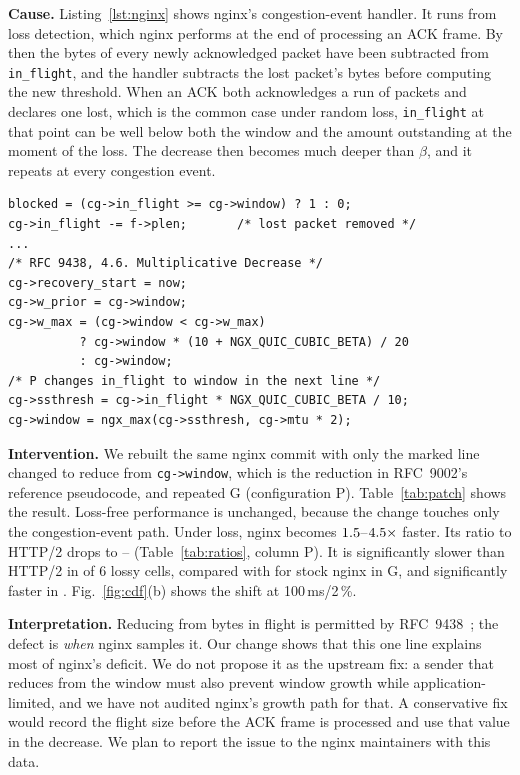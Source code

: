 \documentclass[conference]{IEEEtran}
\newcommand{\hthree}{HTTP/3}
\newcommand{\htwo}{HTTP/2}
\begin{document}
\textbf{Cause.} Listing~\ref{lst:nginx} shows nginx's congestion-event handler. It runs from loss detection, which nginx
performs at the end of processing an ACK frame. By then the bytes of every newly acknowledged packet have been subtracted
from \texttt{in\_flight}, and the handler subtracts the lost packet's bytes before computing the new threshold. When an
ACK both acknowledges a run of packets and declares one lost, which is the common case under random loss,
\texttt{in\_flight} at that point can be well below both the window and the amount outstanding at the moment of the loss.
The decrease then becomes much deeper than $\beta$, and it repeats at every congestion event.

\begin{lstlisting}[caption={Congestion-event handler in nginx's QUIC module (abridged)},
  label={lst:nginx}, float=t]
blocked = (cg->in_flight >= cg->window) ? 1 : 0;
cg->in_flight -= f->plen;       /* lost packet removed */
...
/* RFC 9438, 4.6. Multiplicative Decrease */
cg->recovery_start = now;
cg->w_prior = cg->window;
cg->w_max = (cg->window < cg->w_max)
          ? cg->window * (10 + NGX_QUIC_CUBIC_BETA) / 20
          : cg->window;
/* P changes in_flight to window in the next line */
cg->ssthresh = cg->in_flight * NGX_QUIC_CUBIC_BETA / 10;
cg->window = ngx_max(cg->ssthresh, cg->mtu * 2);
\end{lstlisting}

\textbf{Intervention.} We rebuilt the same nginx commit with only the marked line changed to reduce from
\texttt{cg->window}, which is the reduction in RFC~9002's reference pseudocode, and repeated G (configuration P).
Table~\ref{tab:patch} shows the result. Loss-free performance is unchanged, because the change touches only the
congestion-event path. Under loss, nginx becomes $1.5$--$4.5\times$ faster. Its ratio to
\htwo{} drops to \RatPNgxLossyMin--\RatPNgxLossyMax{} (Table~\ref{tab:ratios}, column P). It is significantly slower than
\htwo{} in \SigPNgxLossySlower{} of 6 lossy cells, compared with \SigGNgxLossySlower{} for stock nginx in G, and
significantly faster in \SigPNgxLossyFaster. Fig.~\ref{fig:cdf}(b) shows the shift at 100\,ms/2\,\%.

\begin{table}[t]
\centering
\caption{Median nginx \hthree{} completion time, stock (G) vs.\ one-line patch (P).}
\label{tab:patch}
\footnotesize

\end{table}

\textbf{Interpretation.} Reducing from bytes in flight is permitted by RFC~9438~\cite{rfc9438}; the defect is
\emph{when} nginx samples it. Our change shows that this one line explains most of nginx's deficit. We do not propose it
as the upstream fix: a sender that reduces from the window must also prevent window growth while application-limited, and
we have not audited nginx's growth path for that. A conservative fix would record the flight size before the ACK frame is
processed and use that value in the decrease. We plan to report the issue to the nginx maintainers with this data.
\end{document}
